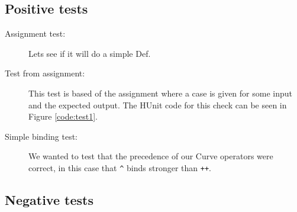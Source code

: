 \subsection{Positive tests}

\begin{description}
\item[Assignment test:] Lets see if it will do a simple Def.

\item[Test from assignment:] This test is based of the assignment where a case
  is given for some input and the expected output. The HUnit code for this check
  can be seen in Figure \ref{code:test1}.

\item[Simple binding test:] We wanted to test that the precedence of our Curve
  operators were correct, in this case that \texttt{\^} binds stronger than
  \texttt{++}.
\end{description}

\subsection{Negative tests}